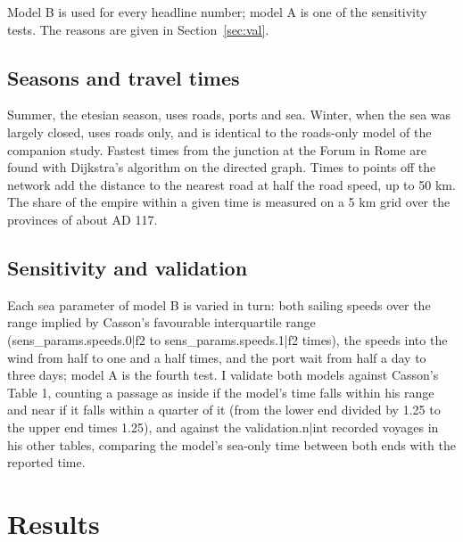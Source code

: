\documentclass[11pt,a4paper]{article}
\begin{document}
Model B is used for every headline number; model A is one of the sensitivity tests. The reasons are given in Section~\ref{sec:val}.

\subsection{Seasons and travel times}
Summer, the etesian season, uses roads, ports and sea. Winter, when the sea was largely closed, uses roads only, and is identical to the roads-only model of the companion study. Fastest times from the junction at the Forum in Rome are found with Dijkstra's algorithm \citep{dijkstra1959} on the directed graph. Times to points off the network add the distance to the nearest road at half the road speed, up to 50 km. The share of the empire within a given time is measured on a 5 km grid over the provinces of about AD 117.

\subsection{Sensitivity and validation}
Each sea parameter of model B is varied in turn: both sailing speeds over the range implied by Casson's favourable interquartile range ({{sens_params.speeds.0|f2}} to {{sens_params.speeds.1|f2}} times), the speeds into the wind from half to one and a half times, and the port wait from half a day to three days; model A is the fourth test. I validate both models against Casson's Table 1, counting a passage as inside if the model's time falls within his range and near if it falls within a quarter of it (from the lower end divided by 1.25 to the upper end times 1.25), and against the {{validation.n|int}} recorded voyages in his other tables, comparing the model's sea-only time between both ends with the reported time.

\section{Results}
\end{document}
